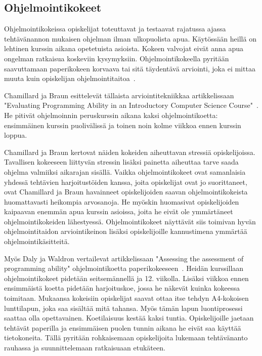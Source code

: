 \documentclass[finnish]{../tktltiki2}
\theoremstyle{definition}
\theoremstyle{remark}
\begin{document}
\subsection{Ohjelmointikokeet}

Ohjelmointikokeissa opiskelijat toteuttavat ja testaavat rajatussa ajassa tehtävänannon mukaisen ohjelman ilman ulkopuolista apua. Käytössään heillä on lehtinen kurssin aikana opetetuista asioista. Kokeen valvojat eivät anna apua ongelman ratkaisua koskeviin kysymyksiin. Ohjelmointikokeella pyritään saavuttamaan paperikokeen korvaava tai sitä täydentävä arviointi, joka ei mittaa muuta kuin opiskelijan ohjelmointitaitoa~\cite{CB00, DW04}.

Chamillard ja Braun esittelevät tällaista arviointitekniikkaa artikkelissaan "Evaluating Programming Ability in an Introductory Computer Science Course"~\cite{CB00}. He pitivät ohjelmoinnin peruskurssin aikana kaksi ohjelmointikoetta: ensimmäinen kurssin puolivälissä ja toinen noin kolme viikkoa ennen kurssin loppua.

Chamillard ja Braun kertovat näiden kokeiden aiheuttavan stressiä opiskelijoissa. Tavallisen kokeeseen liittyvän stressin lisäksi painetta aiheuttaa tarve saada ohjelma valmiiksi aikarajan sisällä. Vaikka ohjelmointikokeet ovat samanlaisia yhdessä tehtävien harjoitustöiden kanssa, joita opiskelijat ovat jo suorittaneet, ovat Chamillard ja Braun havainneet opiskelijoiden saavan ohjelmointikokeista huomattavasti heikompia arvosanoja. He myöskin huomasivat opiskelijoiden kaipaavan enemmän apua kurssin asioissa, joita he eivät ole ymmärtäneet ohjelmointikokeiden lähestyessä. Ohjelmointikokeet näyttävät siis toimivan hyvän ohjelmointitaidon arviointikeinon lisäksi opiskelijoille kannustimena ymmärtää ohjelmointikäsitteitä.

Myös Daly ja Waldron vertailevat artikkelissaan "Assessing the assessment of programming ability" ohjelmointikoetta paperikokeeseen~\cite{DW04}. Heidän kurssillaan ohjelmointikokeet pidetään seitsemännellä ja 12. viikolla. Lisäksi viikkoa ennen ensimmäistä koetta pidetään harjoituskoe, jossa he näkevät kuinka kokeessa toimitaan. Mukaansa kokeisiin opiskelijat saavat ottaa itse tehdyn A4-kokoisen lunttilapun, joka saa sisältää mitä tahansa. Myös tämän lapun luontiprosessi saattaa olla opettavainen. Koetilaisuus kestää kaksi tuntia. Opiskelijoille jaetaan tehtävät paperilla ja ensimmäisen puolen tunnin aikana he eivät saa käyttää tietokoneita. Tällä pyritään rohkaisemaan opiskelijoita lukemaan tehtävänanto rauhassa ja suunnittelemaan ratkaisuaan etukäteen.
\end{document}
